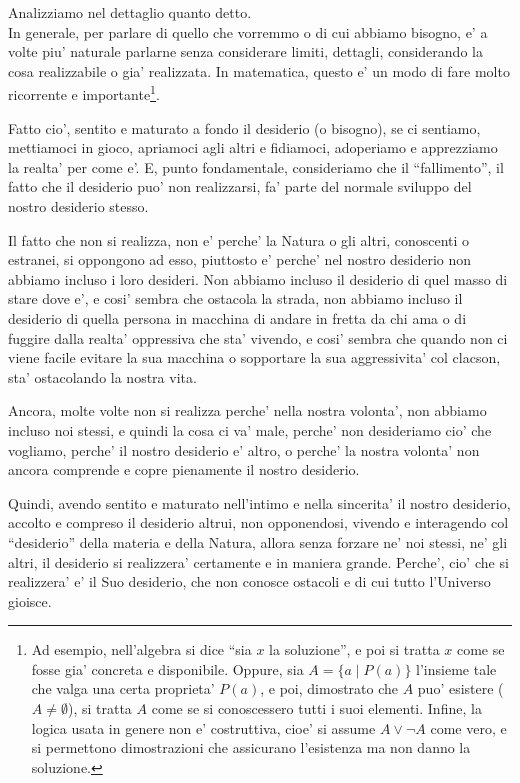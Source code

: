 Analizziamo nel dettaglio quanto detto.\\

In generale, per parlare di quello che vorremmo o di cui abbiamo bisogno, e' a volte piu' naturale parlarne senza considerare limiti, dettagli, considerando la cosa realizzabile o gia' realizzata. In matematica, questo e' un modo di fare molto ricorrente e importante\footnote{Ad esempio, nell'algebra si dice ``sia $x$ la soluzione'', e poi si tratta $x$ come se fosse gia' concreta e disponibile. Oppure, sia $A=\{a \;|\;P(a)\}$ l'insieme tale che valga una certa proprieta' $P(a)$, e poi, dimostrato che $A$ puo' esistere ($A\neq \emptyset$), si tratta $A$ come se si conoscessero tutti i suoi elementi. Infine, la logica usata in genere non e' costruttiva, cioe' si assume $A \lor \lnot A$ come vero, e si permettono dimostrazioni che assicurano l'esistenza ma non danno la soluzione.}.

Fatto cio', sentito e maturato a fondo il desiderio (o bisogno), se ci sentiamo, mettiamoci in gioco, apriamoci agli altri e fidiamoci, adoperiamo e apprezziamo la realta' per come e'. E, punto fondamentale, consideriamo che il ``fallimento'', il fatto che il desiderio puo' non realizzarsi, fa' parte del normale sviluppo del nostro desiderio stesso. 

Il fatto che non si realizza, non e' perche' la Natura o gli altri, conoscenti o estranei, si oppongono ad esso, piuttosto e' perche' nel nostro desiderio non abbiamo incluso i loro desideri. Non abbiamo incluso il desiderio di quel masso di stare dove e', e cosi' sembra che ostacola la strada, non abbiamo incluso il desiderio di quella persona in macchina di andare in fretta da chi ama o di fuggire dalla realta' oppressiva che sta' vivendo, e cosi' sembra che quando non ci viene facile evitare la sua macchina o sopportare la sua aggressivita' col clacson, sta' ostacolando la nostra vita.

Ancora, molte volte non si realizza perche' nella nostra volonta', non abbiamo incluso noi stessi, e quindi la cosa ci va' male, perche' non desideriamo cio' che vogliamo, perche' il nostro desiderio e' altro, o perche' la nostra volonta' non ancora comprende e copre pienamente il nostro desiderio.

Quindi, avendo sentito e maturato nell'intimo e nella sincerita' il nostro desiderio, accolto e compreso il desiderio altrui, non opponendosi, vivendo e interagendo col ``desiderio'' della materia e della Natura, allora senza forzare ne' noi stessi, ne' gli altri, il desiderio si realizzera' certamente e in maniera grande. Perche', cio' che si realizzera' e' il Suo desiderio, che non conosce ostacoli e di cui tutto l'Universo gioisce. 

